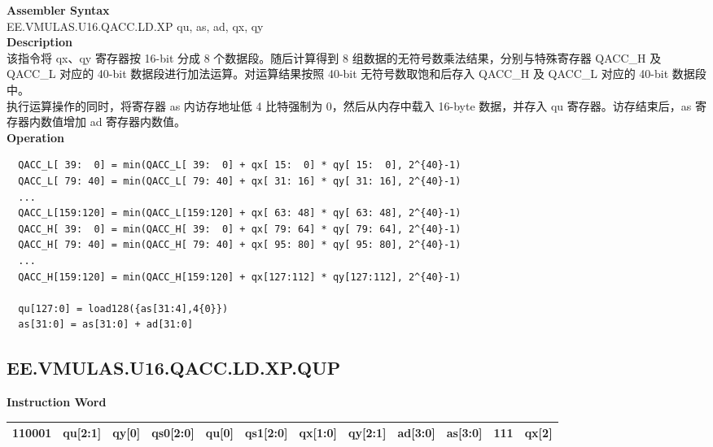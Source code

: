 \textbf{Assembler Syntax} \\
EE.VMULAS.U16.QACC.LD.XP qu, as, ad, qx, qy \\
\textbf{Description} \\
该指令将 qx、qy 寄存器按 16-bit 分成 8 个数据段。随后计算得到 8 组数据的无符号数乘法结果，分别与特殊寄存器 QACC\_H 及 QACC\_L 对应的 40-bit 数据段进行加法运算。对运算结果按照 40-bit 无符号数取饱和后存入 QACC\_H 及 QACC\_L 对应的 40-bit 数据段中。\\
执行运算操作的同时，将寄存器 as 内访存地址低 4 比特强制为 0，然后从内存中载入 16-byte 数据，并存入 qu 寄存器。访存结束后，as 寄存器内数值增加 ad 寄存器内数值。\\
\textbf{Operation}
\begin{lstlisting}
  QACC_L[ 39:  0] = min(QACC_L[ 39:  0] + qx[ 15:  0] * qy[ 15:  0], 2^{40}-1)
  QACC_L[ 79: 40] = min(QACC_L[ 79: 40] + qx[ 31: 16] * qy[ 31: 16], 2^{40}-1)
  ...
  QACC_L[159:120] = min(QACC_L[159:120] + qx[ 63: 48] * qy[ 63: 48], 2^{40}-1)
  QACC_H[ 39:  0] = min(QACC_H[ 39:  0] + qx[ 79: 64] * qy[ 79: 64], 2^{40}-1)
  QACC_H[ 79: 40] = min(QACC_H[ 79: 40] + qx[ 95: 80] * qy[ 95: 80], 2^{40}-1)
  ...
  QACC_H[159:120] = min(QACC_H[159:120] + qx[127:112] * qy[127:112], 2^{40}-1)

  qu[127:0] = load128({as[31:4],4{0}})
  as[31:0] = as[31:0] + ad[31:0]
\end{lstlisting}

\clearpage
\subsection{EE.VMULAS.U16.QACC.LD.XP.QUP}\label{instruction:EEVMULASU16QACCLDXPQUP}
\setlength\tabcolsep{6pt}
\textbf{Instruction Word} \\
\begin{tabular}{|c|c|c|c|c|c|c|c|c|c|c|c|}
	\hline
	110001 & qu[2:1] & qy[0] & qs0[2:0] & qu[0] & qs1[2:0] & qx[1:0] & qy[2:1] & ad[3:0] & as[3:0] & 111 & qx[2] \\
	\hline
\end{tabular}

